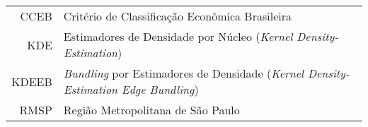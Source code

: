 {
\raggedbottom



\begin{tabular}{rl}
  CCEB         & Critério de Classificação Econômica Brasileira \\
	KDE          & Estimadores de Densidade por Núcleo (\emph{Kernel Density-Estimation})\\
	KDEEB        & \emph{Bundling} por Estimadores de Densidade (\emph{Kernel Density-Estimation Edge Bundling})\\
  RMSP         & Região Metropolitana de São Paulo
\end{tabular}

%



\disablenewpage{\listoffigures}

\disablenewpage{\listoftables}



\tableofcontents

} %

